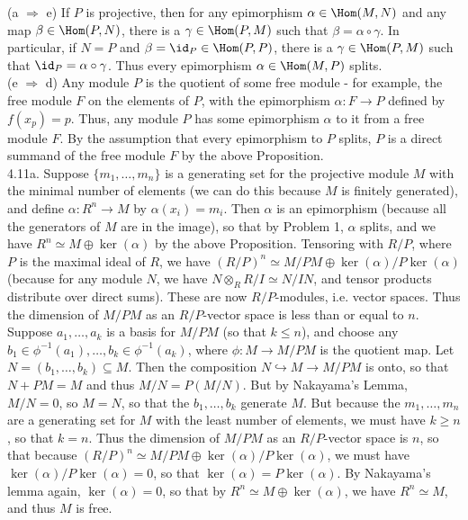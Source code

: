 \documentclass[11pt]{article}
\begin{document}
(a $\Rightarrow$ e) If $P$ is projective, then for any epimorphism $\alpha\in\Hom(M,N)$ and any map $\beta\in\Hom(P,N)$, there is a $\gamma\in\Hom(P,M)$ such that $\beta=\alpha\circ\gamma$. In particular, if $N=P$ and $\beta=\id_P\in\Hom(P,P)$, there is a $\gamma\in\Hom(P,M)$ such that $\id_P=\alpha\circ\gamma$. Thus every epimorphism $\alpha\in\Hom(M,P)$ splits.\\

(e $\Rightarrow$ d) Any module $P$ is the quotient of some free module - for example, the free module $F$ on the elements of $P$, with the epimorphism $\alpha:F\rightarrow P$ defined by $f(x_p)= p$. Thus, any module $P$ has some epimorphism $\alpha$ to it from a free module $F$. By the assumption that every epimorphism to $P$ splits, $P$ is a direct summand of the free module $F$ by the above Proposition.\\

\num{4.11a.} Suppose $\{m_1,\ldots,m_n\}$ is a generating set for the projective module $M$ with the minimal number of elements (we can do this because $M$ is finitely generated), and define $\alpha:R^n\rightarrow M$ by $\alpha(x_i)=m_i$. Then $\alpha$ is an epimorphism (because all the generators of $M$ are in the image), so that by Problem 1, $\alpha$ splits, and we have $R^n\simeq M\oplus\ker(\alpha)$ by the above Proposition. Tensoring with $R/P$, where $P$ is the maximal ideal of $R$, we have $(R/P)^n\simeq M/PM\oplus \ker(\alpha)/P\ker(\alpha)$ (because for any module $N$, we have $N\otimes_R R/I\simeq N/IN$, and tensor products distribute over direct sums). These are now $R/P$-modules, i.e. vector spaces. Thus the dimension of $M/PM$ as an $R/P$-vector space is less than or equal to $n$. Suppose $a_1,\ldots,a_k$ is a basis for $M/PM$ (so that $k\leq n$), and choose any $b_1\in\phi^{-1}(a_1),\ldots,b_k\in\phi^{-1}(a_k)$, where $\phi:M\rightarrow M/PM$ is the quotient map. Let $N=(b_1,\ldots,b_k)\subseteq M$. Then the composition $N\hookrightarrow M\rightarrow M/PM$ is onto, so that $N+PM=M$ and thus $M/N=P(M/N)$. But by Nakayama's Lemma, $M/N=0$, so $M=N$, so that the $b_1,\ldots,b_k$ generate $M$. But because the $m_1,\ldots,m_n$ are a generating set for $M$ with the least number of elements, we must have $k\geq n$, so that $k=n$. Thus the dimension of $M/PM$ as an $R/P$-vector space is $n$, so that because $(R/P)^n\simeq M/PM\oplus \ker(\alpha)/P\ker(\alpha)$, we must have $\ker(\alpha)/P\ker(\alpha)=0$, so that $\ker(\alpha)=P\ker(\alpha)$. By Nakayama's lemma again, $\ker(\alpha)=0$, so that by $R^n\simeq M\oplus\ker(\alpha)$, we have $R^n\simeq M$, and thus $M$ is free. \\
\end{document}
